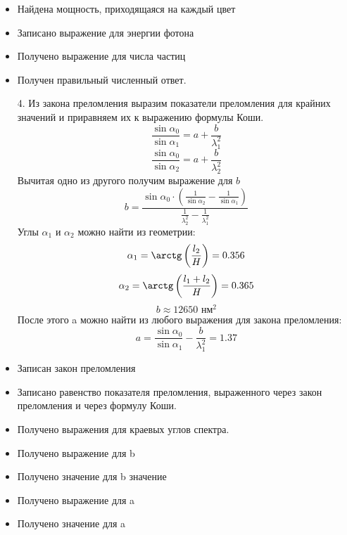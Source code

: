     \markSection

    \begin{itemize}
    \item Найдена мощность, приходящаяся на каждый цвет
    \item Записано выражение для энергии фотона
    \item Получено выражение для числа частиц
    \item Получен правильный численный ответ.
    \end{itemize}
    \begin{enumerate}
    \item [4.] Из закона преломления выразим показатели преломления для крайних значений и приравняем их к выражению формулы Коши.
    $$\frac{\sin{\alpha_0}}{\sin{\alpha_1}}=a+\frac{b}{\lambda_1^2}$$
    $$\frac{\sin{\alpha_0}}{\sin{\alpha_2}}=a+\frac{b}{\lambda_2^2}$$
    Вычитая одно из другого получим выражение для $b$
    $$b=\frac{\sin{\alpha_0}\cdot\left(\frac{1}{\sin{\alpha_2}}-\frac{1}{\sin{\alpha_1}}\right)}{\frac{1}{\lambda_2^2}-\frac{1}{\lambda_1^2}}$$
    Углы $\alpha_1$ и $\alpha_2$ можно найти из геометрии:
    $$\alpha_1=\arctg\left(\frac{l_2}{H}\right)=0.356$$
    $$\alpha_2=\arctg\left(\frac{l_1+l_2}{H}\right)=0.365$$
    $$b\approx12650\text{ нм}^2$$
    После этого a можно найти из любого выражения для закона преломления:	
    $$a=\frac{\sin{\alpha_0}}{\sin{\alpha_1}}-\frac{b}{\lambda_1^2}=1.37$$
    \end{enumerate}
    
    \markSection

    \begin{itemize}
    \item Записан закон преломления 
    \item Записано равенство показателя преломления, выраженного через закон преломления и через формулу Коши.
    \item Получено выражения для краевых углов спектра.
    \item Получено выражение для b
    \item Получено значение для b значение
    \item Получено выражение для a
    \item Получено значение для a
    \end{itemize}
    
